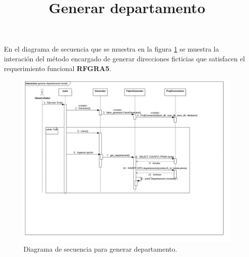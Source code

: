 \title{\textbf{Generar departamento\\}}
En el diagrama de secuencia que se muestra en la figura \ref{image:DSGenerarDepartamento} se muestra la interación del método encargado de generar direcciones ficticias que satisfacen el requerimiento funcional \textbf{RFGRA5}.
\FloatBarrier
\begin{figure}[htbp!]
		\centering
			\includegraphics[width=1 \textwidth]{imagenes/DSRuben/gen_department_generator}
		\caption{Diagrama de secuencia para generar departamento.}
		\label{image:DSGenerarDepartamento}
\end{figure}
\FloatBarrier





